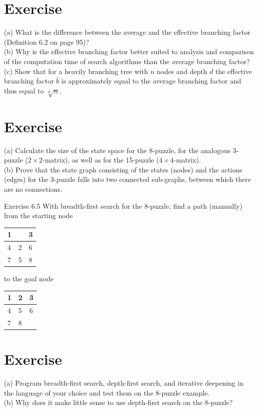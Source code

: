 \documentclass[10pt]{book}
\begin{document}
\section{Exercise}
(a) What is the difference between the average and the effective branching factor (Definition 6.2 on page 95)?\\
(b) Why is the effective branching factor better suited to analysis and comparison of the computation time of search algorithms than the average branching factor?\\
(c) Show that for a heavily branching tree with $n$ nodes and depth $d$ the effective branching factor $\bar{b}$ is approximately equal to the average branching factor and thus equal to $\sqrt[d]{n}$.

\section{Exercise}
(a) Calculate the size of the state space for the 8-puzzle, for the analogous 3-puzzle ($2 \times 2$-matrix), as well as for the 15-puzzle ($4 \times 4$-matrix).\\
(b) Prove that the state graph consisting of the states (nodes) and the actions (edges) for the 3-puzzle falls into two connected sub-graphs, between which there are no connections.

Exercise 6.5 With breadth-first search for the 8-puzzle, find a path (manually) from the starting node

\begin{center}
\begin{tabular}{|l|l|l|}
\hline
1 &  & 3 \\
\hline
4 & 2 & 6 \\
\hline
7 & 5 & 8 \\
\hline
\end{tabular}
\end{center}

to the goal node

\begin{center}
\begin{tabular}{|l|l|l|}
\hline
1 & 2 & 3 \\
\hline
4 & 5 & 6 \\
\hline
7 & 8 &  \\
\hline
\end{tabular}
\end{center}

\section{Exercise}
(a) Program breadth-first search, depth-first search, and iterative deepening in the language of your choice and test them on the 8-puzzle example.\\
(b) Why does it make little sense to use depth-first search on the 8-puzzle?
\end{document}
